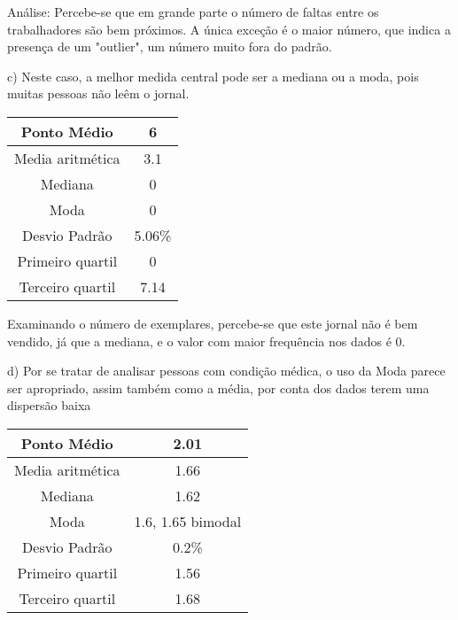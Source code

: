 \documentclass[12pt]{article}
\begin{document}
    Análise: Percebe-se que em grande parte o número de faltas entre os trabalhadores são bem próximos.
    A única exceção é o maior número, que indica a presença de um "outlier", um número muito fora do padrão.

    c) Neste caso, a melhor medida central pode ser a mediana ou a moda, pois muitas 
    pessoas não leêm o jornal. 

    \begin{center}
        \begin{tabular}{|c | c |} 
        \hline
        Ponto Médio & 6 \\ 
        \hline
        Media aritmética & 3.1 \\ 
        \hline
        Mediana & 0 \\ 
        \hline
        Moda & 0 \\ 
        \hline
        Desvio Padrão & 5.06\% \\ 
        \hline
        Primeiro quartil & 0 \\ 
        \hline
        Terceiro quartil & 7.14 \\ 
        \hline
       \end{tabular}
    \end{center}

    Examinando o número de exemplares, percebe-se que este jornal não é bem vendido, 
    já que a mediana, e o valor com maior frequência nos dados é 0.

    d) Por se tratar de analisar pessoas com condição médica, o uso da Moda parece ser
    apropriado, assim também como a média, por conta dos dados terem uma dispersão baixa

    \begin{center}
        \begin{tabular}{|c | c |} 
        \hline
        Ponto Médio & 2.01 \\ 
        \hline
        Media aritmética & 1.66 \\ 
        \hline
        Mediana & 1.62 \\ 
        \hline
        Moda & 1.6, 1.65 bimodal \\ 
        \hline
        Desvio Padrão & 0.2\% \\ 
        \hline
        Primeiro quartil & 1.56 \\ 
        \hline
        Terceiro quartil & 1.68 \\ 
        \hline
       \end{tabular}
    \end{center}
\end{document}
